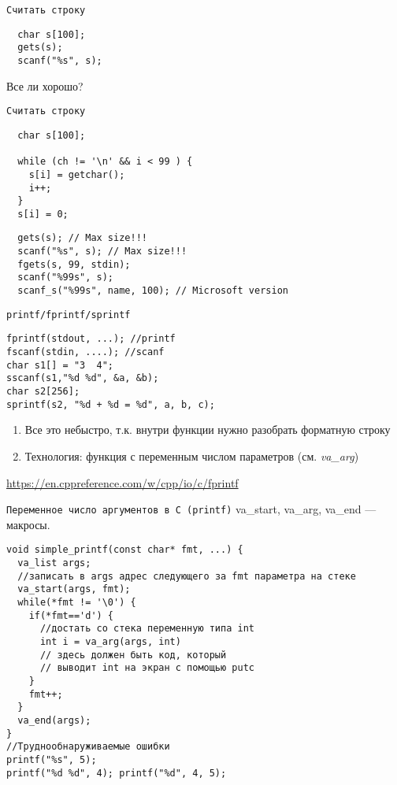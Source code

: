 \documentclass[pdf, 10pt, unicode]{beamer}
\begin{document}
\begin{frame}[fragile]{{\tt Считать строку}}

\begin{lstlisting}
  char s[100];
  gets(s);
  scanf("%s", s);
\end{lstlisting}
Все ли хорошо?
\end{frame}

\begin{frame}[fragile]{{\tt Считать строку}}

\begin{lstlisting}
  char s[100];

  while (ch != '\n' && i < 99 ) {
    s[i] = getchar();
    i++;
  }
  s[i] = 0;
\end{lstlisting}

\begin{lstlisting}
  gets(s); // Max size!!!
  scanf("%s", s); // Max size!!!
  fgets(s, 99, stdin);
  scanf("%99s", s);
  scanf_s("%99s", name, 100); // Microsoft version
\end{lstlisting}

\end{frame}


\begin{frame}[fragile]{{\tt printf/fprintf/sprintf}}
\begin{lstlisting}
fprintf(stdout, ...); //printf
fscanf(stdin, ....); //scanf
char s1[] = "3  4";
sscanf(s1,"%d %d", &a, &b);
char s2[256];
sprintf(s2, "%d + %d = %d", a, b, c);
\end{lstlisting}
\begin{enumerate}
  \item Все это небыстро, т.к. внутри функции нужно разобрать форматную строку
  \item Технология: функция с переменным числом параметров (см. \emph{va\_arg})
\end{enumerate}
\url{https://en.cppreference.com/w/cpp/io/c/fprintf}
\end{frame}


\begin{frame}[fragile]{{\tt Переменное число аргументов в C (printf)}}
va\_start, va\_arg, va\_end --- макросы.
\begin{verbatim}
void simple_printf(const char* fmt, ...) {
  va_list args;
  //записать в args адрес следующего за fmt параметра на стеке
  va_start(args, fmt);
  while(*fmt != '\0') {
    if(*fmt=='d') {
      //достать со стека переменную типа int
      int i = va_arg(args, int)
      // здесь должен быть код, который
      // выводит int на экран с помощью putc
    }
    fmt++;
  }
  va_end(args);
}
//Труднообнаруживаемые ошибки
printf("%s", 5);
printf("%d %d", 4); printf("%d", 4, 5);
\end{verbatim}

\end{frame}
\end{document}
